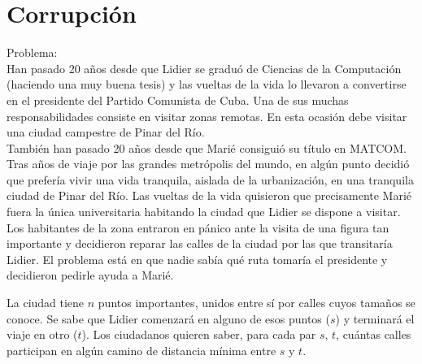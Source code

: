 \documentclass[
10pt, %
a4paper, %
oneside, %
headinclude,footinclude, %
BCOR5mm, %
]{scrartcl}
\begin{document}
\let\thefootnote\relax{}

\let\thefootnote\relax{}


\newpage %


\section{Corrupción}

Problema: \\

Han pasado 20 años desde que Lidier se graduó de Ciencias de la Computación  
(haciendo una muy buena tesis) y las vueltas de la vida lo llevaron a convertirse  
en el presidente del Partido Comunista de Cuba. Una de sus muchas responsabilidades  
consiste en visitar zonas remotas. En esta ocasión debe visitar una  
ciudad campestre de Pinar del Río.\\

También han pasado 20 años desde que Marié consiguió su título en MATCOM.  
Tras años de viaje por las grandes metrópolis del mundo, en algún punto  
decidió que prefería vivir una vida tranquila, aislada de la urbanización, en una  
tranquila ciudad de Pinar del Río. Las vueltas de la vida quisieron que precisamente  
Marié fuera la única universitaria habitando la ciudad que Lidier se  
dispone a visitar.\\

Los habitantes de la zona entraron en pánico ante la visita de una figura tan  
importante y decidieron reparar las calles de la ciudad por las que transitaría  
Lidier. El problema está en que nadie sabía qué ruta tomaría el presidente y  
decidieron pedirle ayuda a Marié.

La ciudad tiene $n$ puntos importantes, unidos entre sí por calles cuyos  
tamaños se conoce. Se sabe que Lidier comenzará en alguno de esos puntos  
($s$) y terminará el viaje en otro ($t$). Los ciudadanos quieren saber, para  
cada par $s$, $t$, cuántas calles participan en algún camino de distancia mínima  
entre $s$ y $t$. \\
\end{document}
